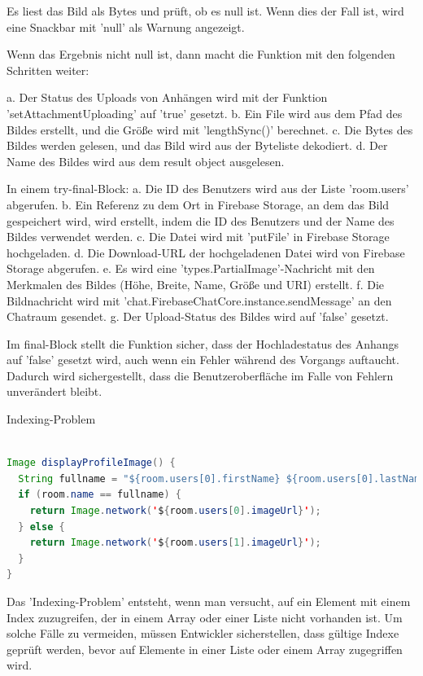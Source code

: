 Es liest das Bild als Bytes und prüft, ob es null ist. Wenn dies der Fall ist, wird eine Snackbar mit 'null' als Warnung angezeigt.

Wenn das Ergebnis nicht null ist, dann macht die Funktion mit den folgenden Schritten weiter:

a. Der Status des Uploads von Anhängen wird mit der Funktion 'setAttachmentUploading' auf 'true' gesetzt.
b. Ein File wird aus dem Pfad des Bildes erstellt, und die Größe wird mit 'lengthSync()' berechnet.
c. Die Bytes des Bildes werden gelesen, und das Bild wird aus der Byteliste dekodiert.
d. Der Name des Bildes wird aus dem result object ausgelesen.

In einem try-final-Block:
a. Die ID des Benutzers wird aus der Liste 'room.users' abgerufen.
b. Ein Referenz zu dem Ort in Firebase Storage, an dem das Bild gespeichert wird, wird erstellt, indem die ID des Benutzers und der Name des Bildes verwendet werden.
c. Die Datei wird mit 'putFile' in Firebase Storage hochgeladen.
d. Die Download-URL der hochgeladenen Datei wird von Firebase Storage abgerufen.
e. Es wird eine 'types.PartialImage'-Nachricht mit den Merkmalen des Bildes (Höhe, Breite, Name, Größe und URI) erstellt.
f. Die Bildnachricht wird mit 'chat.FirebaseChatCore.instance.sendMessage' an den Chatraum gesendet.
g. Der Upload-Status des Bildes wird auf 'false' gesetzt.

Im final-Block stellt die Funktion sicher, dass der Hochladestatus des Anhangs auf 'false' gesetzt wird, auch wenn ein Fehler während des Vorgangs auftaucht. Dadurch wird sichergestellt, dass die Benutzeroberfläche im Falle von Fehlern unverändert bleibt.


Indexing-Problem


\begin{lstlisting}[language=Java,caption=Anzeige des Profilbildes,label=lst:fotoSelektion]  

Image displayProfileImage() {
  String fullname = "${room.users[0].firstName} ${room.users[0].lastName}";
  if (room.name == fullname) {
    return Image.network('${room.users[0].imageUrl}');
  } else {
    return Image.network('${room.users[1].imageUrl}');
  }
}

\end{lstlisting}

Das 'Indexing-Problem' entsteht, wenn man versucht, auf ein Element mit einem Index zuzugreifen, der in einem Array oder einer Liste nicht vorhanden ist. Um solche Fälle zu vermeiden, müssen Entwickler sicherstellen, dass gültige Indexe geprüft werden, bevor auf Elemente in einer Liste oder einem Array zugegriffen wird.

